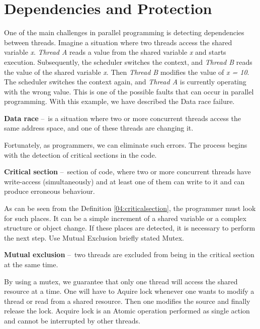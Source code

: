 \section{Dependencies and Protection}
\label{dependenciesandprotection}

One of the main challenges in parallel programming is detecting dependencies between threads. Imagine a situation where two threads access the shared variable \emph{x}. \emph{Thread A} reads a value from the shared variable \emph{x} and starts execution. Subsequently, the scheduler switches the context, and \emph{Thread B} reads the value of the shared variable \emph{x}. Then \emph{Thread B} modifies the value of \emph{x = 10}. The scheduler switches the context again, and \emph{Thread A} is currently operating with the wrong value. This is one of the possible faults that can occur in parallel programming. With this example, we have described the Data race failure.

\begin{definition}
    \textbf{Data race} \---\ is a situation where two or more concurrent threads access the same address space, and one of these threads are changing it.
\end{definition}
Fortunately, as programmers, we can eliminate such errors. The process begins with the detection of critical sections in the code.
\begin{definition}
    \label{04:criticalsection}
    \textbf{Critical section} \---\ section of code, where two or more concurrent threads have write-access (simultaneously) and at least one of them can write to it and can produce erroneous behaviour.
\end{definition}
As can be seen from the Definition \ref{04:criticalsection}, the programmer must look for such places. It can be a simple increment of a shared variable or a complex structure or object change. If these places are detected, it is necessary to perform the next step. Use Mutual Exclusion briefly stated Mutex.
\begin {definition}
    \textbf{Mutual exclusion} \---\ two threads are excluded from being in the critical section at the same time.
\end {definition}
By using a mutex, we guarantee that only one thread will access the shared resource at a time. One will have to Aquire lock whenever one wants to modify a thread or read from a shared resource. Then one modifies the source and finally release the lock. Acquire lock is an Atomic operation performed as single action and cannot be interrupted by other threads.

